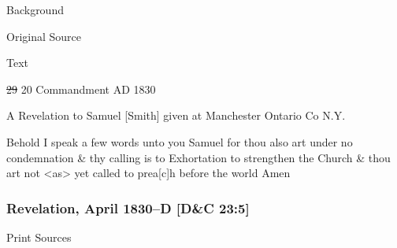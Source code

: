 			\begin{description}
				\item[Background]
			\end{description}
			
			
			\begin{description}
				\item[Original Source]
			\end{description}
			
			
			\begin{description}
				\item[Text]
			\end{description}
			
				\begin{tightcenter}
				\sout{29} 20 Commandment AD 1830
				\end{tightcenter}
				
				A Revelation to Samuel [Smith] given at Manchester Ontario Co N.Y.
				
				Behold I speak a few words unto you Samuel for thou also art under no condemnation \& thy calling is to Exhortation to strengthen the Church \& thou art not <as> yet called to prea[c]h before the world Amen
				
		\subsubsection{Revelation, April 1830--D [D\&C 23:5]}
			\label{EMS-1830-JS-APR-1830-D}
		
			\begin{description}
				\item[Print Sources]
			\end{description}

